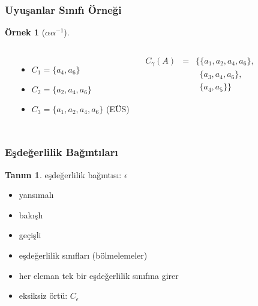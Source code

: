 \documentclass[dvipsnames]{beamer}
\theoremstyle{definition}
\newtheorem{tanim}[theorem]{Tanım}
\theoremstyle{example}
\newtheorem{ornek}[theorem]{Örnek}
\theoremstyle{plain}
\begin{document}
\begin{frame}
  \frametitle{Uyuşanlar Sınıfı Örneği}

  \begin{ornek}[$\alpha \alpha^{-1}$]
    \begin{columns}
      \begin{center}
      \end{center}

      \pause
      \begin{itemize}
        \item $C_1=\{a_4,a_6\}$
        \item $C_2=\{a_2,a_4,a_6\}$
        \item $C_3=\{a_1,a_2,a_4,a_6\}$ (EÜS)
      \end{itemize}

      \pause
      \medskip
      \begin{eqnarray*}
        C_\gamma (A) & = & \{\{a_1,a_2,a_4,a_6\},\\
                     &   & ~~\{a_3,a_4,a_6\},\\
                     &   & ~~\{a_4,a_5\}\}
      \end{eqnarray*}
    \end{columns}
  \end{ornek}
\end{frame}

\begin{frame}
  \frametitle{Eşdeğerlilik Bağıntıları}

  \begin{tanim}
    \alert{eşdeğerlilik bağıntısı}: $\epsilon$
    \begin{itemize}
      \item yansımalı
      \item bakışlı
      \item geçişli
    \end{itemize}
  \end{tanim}

  \pause
  \begin{itemize}
    \item \alert{eşdeğerlilik sınıfları (bölmelemeler)}
    \item her eleman tek bir eşdeğerlilik sınıfına girer

    \medskip
    \item eksiksiz örtü: $C_\epsilon$
  \end{itemize}
\end{frame}
\end{document}
